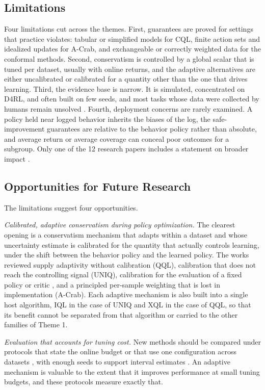 \documentclass[journal]{IEEEtran}
\begin{document}
\subsection{Limitations}
Four limitations cut across the themes. First, guarantees are proved for settings that practice violates: tabular or simplified models for CQL, finite action sets and idealized updates for A-Crab, and exchangeable or correctly weighted data for the conformal methods. Second, conservatism is controlled by a global scalar that is tuned per dataset, usually with online returns, and the adaptive alternatives are either uncalibrated or calibrated for a quantity other than the one that drives learning. Third, the evidence base is narrow. It is simulated, concentrated on D4RL, and often built on few seeds, and most tasks whose data were collected by humans remain unsolved \cite{tarasov2023rebrac}. Fourth, deployment concerns are rarely examined. A policy held near logged behavior inherits the biases of the log, the safe-improvement guarantees are relative to the behavior policy rather than absolute, and average return or average coverage can conceal poor outcomes for a subgroup. Only one of the 12 research papers includes a statement on broader impact \cite{fujimoto2021td3bc}.

\subsection{Opportunities for Future Research}
The limitations suggest four opportunities.

\emph{Calibrated, adaptive conservatism during policy optimization.} The clearest opening is a conservatism mechanism that adapts within a dataset and whose uncertainty estimate is calibrated for the quantity that actually controls learning, under the shift between the behavior policy and the learned policy. The works reviewed supply adaptivity without calibration (QQL), calibration that does not reach the controlling signal (UNIQ), calibration for the evaluation of a fixed policy or critic \cite{gan2025conformal,vanderlaan2026bellman}, and a principled per-sample weighting that is lost in implementation (A-Crab). Each adaptive mechanism is also built into a single host algorithm, IQL in the case of UNIQ and XQL in the case of QQL, so that its benefit cannot be separated from that algorithm or carried to the other families of Theme 1.

\emph{Evaluation that accounts for tuning cost.} New methods should be compared under protocols that state the online budget \cite{kurenkov2022budget,jackson2025unifloral} or that use one configuration across datasets \cite{gao2026qql}, with enough seeds to support interval estimates \cite{agarwal2021precipice}. An adaptive mechanism is valuable to the extent that it improves performance at small tuning budgets, and these protocols measure exactly that.
\end{document}
